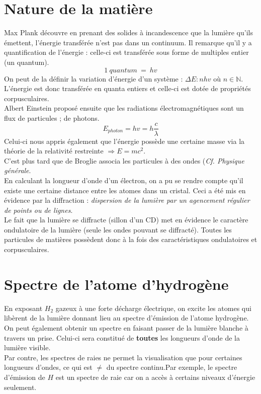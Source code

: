 \documentclass[british,french,11pt, a4paper, openany]{book}
\begin{document}
\section{Nature de la matière}
Max Plank découvre en prenant des solides à incandescence que la lumière qu'ils émettent, l'énergie transférée n'est pas dans un continuum. Il remarque qu'il y a quantification de l'énergie : celle-ci est transférée sous forme de multiples entier (un quantum).
$$1\ quantum\ =\ hv$$
On peut de la définir la variation d'énergie d'un système : $\Delta E : n h v$ où $n \in \mathbb{N}$. L'énergie est donc transférée en quanta entiers et celle-ci est dotée de propriétés corpusculaires.\\

Albert Einstein proposé ensuite que les radiations électromagnétiques sont un flux de particules ; de photons.
$$E_{photon} = h v = h\frac{c}{\lambda}$$
Celui-ci nous appris également que l'énergie possède une certaine masse via la théorie de la relativité restreinte $\Rightarrow E = mc^2$.\\

C'est plus tard que de Broglie associa les particules à des ondes (\textit{Cf. Physique générale}.\\
En calculant la longueur d'onde d'un électron, on a pu se rendre compte qu'il existe une certaine distance entre les atomes dans un cristal. Ceci a été mis en évidence par la diffraction : \textit{dispersion de la lumière par un agencement régulier de points ou de lignes}.\\

Le fait que la lumière se diffracte (sillon d'un CD) met en évidence le caractère ondulatoire de la lumière (seule les ondes pouvant se diffracté). Toutes les particules de matières possèdent donc à la fois des caractéristiques ondulatoires et corpusculaires.

\section{Spectre de l'atome d'hydrogène}
En exposant $H_2$ gazeux à une forte décharge électrique, on excite les atomes qui libèrent de la lumière donnant lieu au spectre d'émission de l'atome hydrogène.
On peut également obtenir un spectre en faisant passer de la lumière blanche à travers un prise. Celui-ci sera constitué de \textbf{toutes} les longueurs d'onde de la lumière visible.\\

Par contre, les spectres de raies ne permet la visualisation que pour certaines longueurs d'ondes, ce qui est $\neq$ du spectre continu.Par exemple, le spectre d'émission de $H$ est un spectre de raie car on a accès à certains niveaux d'énergie seulement.
\end{document}

